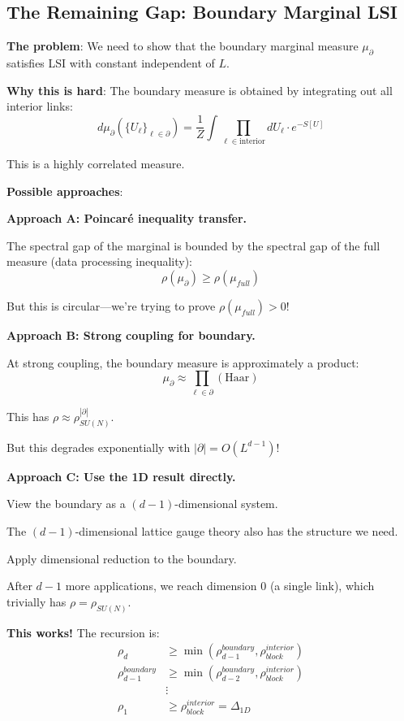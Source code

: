 \subsection{The Remaining Gap: Boundary Marginal LSI}

\textbf{The problem}: We need to show that the boundary marginal measure 
$\mu_\partial$ satisfies LSI with constant independent of $L$.

\textbf{Why this is hard}: The boundary measure is obtained by integrating 
out all interior links:
\[
d\mu_\partial(\{U_\ell\}_{\ell \in \partial}) = \frac{1}{Z} \int \prod_{\ell \in \text{interior}} dU_\ell \cdot e^{-S[U]}
\]

This is a highly correlated measure.

\textbf{Possible approaches}:

\textbf{Approach A: Poincaré inequality transfer.}

The spectral gap of the marginal is bounded by the spectral gap of the full 
measure (data processing inequality):
\[
\rho(\mu_\partial) \geq \rho(\mu_{full})
\]

But this is circular—we're trying to prove $\rho(\mu_{full}) > 0$!

\textbf{Approach B: Strong coupling for boundary.}

At strong coupling, the boundary measure is approximately a product:
\[
\mu_\partial \approx \prod_{\ell \in \partial} (\text{Haar})
\]

This has $\rho \approx \rho_{SU(N)}^{|\partial|}$.

But this degrades exponentially with $|\partial| = O(L^{d-1})$!

\textbf{Approach C: Use the 1D result directly.}

View the boundary as a $(d-1)$-dimensional system.

The $(d-1)$-dimensional lattice gauge theory also has the structure we need.

Apply dimensional reduction to the boundary.

After $d-1$ more applications, we reach dimension 0 (a single link), which 
trivially has $\rho = \rho_{SU(N)}$.

\textbf{This works!} The recursion is:
\begin{align}
\rho_d &\geq \min(\rho_{d-1}^{boundary}, \rho_{block}^{interior}) \\
\rho_{d-1}^{boundary} &\geq \min(\rho_{d-2}^{boundary}, \rho_{block}^{interior}) \\
&\vdots \\
\rho_1 &\geq \rho_{block}^{interior} = \Delta_{1D}
\end{align}

